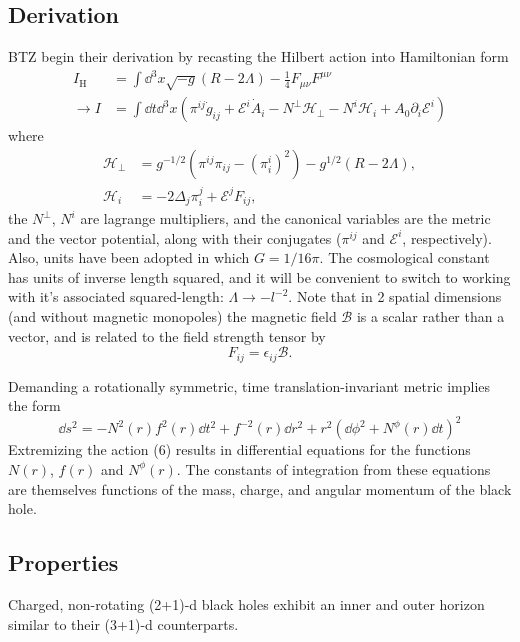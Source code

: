 \documentclass[12pt]{article}
\begin{document}
\subsection{Derivation}
BTZ begin their derivation by recasting the Hilbert action into Hamiltonian form
\begin{align}
    I_\text{H} &= \int \dd^3x\sqrt{-g}\left(R - 2\Lambda\right) - \frac{1}{4}F_{\mu\nu}F^{\mu\nu} \\
    \to I &= \int\dd t\dd^3x\left(\pi^{ij}\dot{g}_{ij} + \mathcal{E}^i\dot{A}_i - N^\perp\mathcal{H}_\perp - N^i\mathcal{H}_i + A_0\partial_i\mathcal{E}^i\right) \nonumber
\end{align}
where
\begin{align}
    \mathcal{H}_\perp &= g^{-1/2}(\pi^{ij}\pi_{ij} -(\pi_i^i)^2) - g^{1/2}(R-2\Lambda), \\
    \mathcal{H}_i &= -2\Delta_j\pi_i^j + \mathcal{E}^jF_{ij}, \nonumber
\end{align}
the $N^\perp$, $N^i$ are lagrange multipliers, and the canonical variables are the metric and the vector potential, along with their conjugates ($\pi^{ij}$ and $\mathcal{E}^i$, respectively). Also, units have been adopted in which $G = 1/16\pi$. The cosmological constant has units of inverse length squared, and it will be convenient to switch to working with it's associated squared-length: $\Lambda \to -l^{-2}$. Note that in 2 spatial dimensions (and without magnetic monopoles) the magnetic field $\mathcal{B}$ is a scalar rather than a vector, and is related to the field strength tensor by \[ F_{ij} = \epsilon_{ij}\mathcal{B}. \]

Demanding a rotationally symmetric, time translation-invariant metric implies the form
\begin{equation}
    \dd s^2 = -N^2(r)f^2(r)\dd t^2 + f^{-2}(r)\dd r^2 + r^2\left(\dd \phi^2 + N^\phi(r)\dd t\right)^2
\end{equation}
Extremizing the action (6) results in differential equations for the functions $N(r)$, $f(r)$ and $N^\phi(r)$. The constants of integration from these equations are themselves functions of the mass, charge, and angular momentum of the black hole.

\subsection{Properties}
Charged, non-rotating (2+1)-d black holes exhibit an inner and outer horizon similar to their (3+1)-d counterparts.
\end{document}
